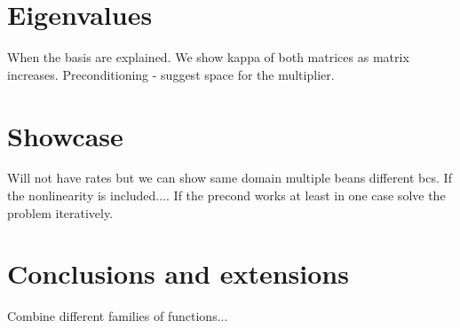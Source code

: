 \documentclass{marine_2015}
\begin{document}
\section{Eigenvalues}
When the basis are explained. We show kappa of both matrices as matrix
increases. Preconditioning - suggest space for the multiplier.

\section{Showcase}
Will not have rates but we can show same domain multiple beans different bcs. If
the nonlinearity is included.... If the precond works at least in one case solve
the problem iteratively.

\section{Conclusions and extensions}
Combine different families of functions...
\end{document}
